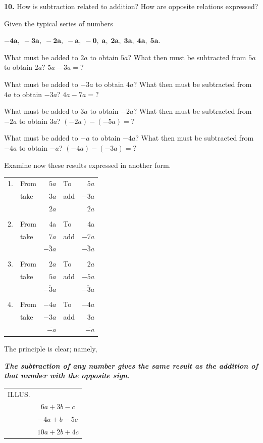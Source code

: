 \documentclass{book}
\begin{document}
\textbf{ 10.} How is subtraction related to addition? How are
opposite relations expressed?

Given the typical series of numbers

$\mathbf{- 4a,\; - 3a,\; - 2a,\; - a,\; - 0,\; a,\; 2a,\; 3a,\;
4a,\; 5a.}$

What must be added to $2a$ to obtain $5a$? What then must be
subtracted from $5a$ to obtain $2a?$ $5a - 3a = ?$

What must be added to $-3a$ to obtain $4a$? What then must be
subtracted from $4a$ to obtain $-3a$? $4a - 7a = ?$

What must be added to $3a$ to obtain $-2a$? What
then must be subtracted from $-2a$ to obtain $3a$?
$(-2a)-(-5a)=?$

What must be added to $-a$ to obtain $-4a$? What
then must be subtracted from $-4a$ to obtain $-a$?
$(-4a)-(-3a)=?$

Examine now these results expressed in another form.

\begin{tabular}{llrlr}
1.&From&$5a$&To&$5a$\\
 &take&$3a$&add&$-3a$\\
 & & $\overline{\;2a}$& &$\overline{\;2a}$\\
 \\
2.&From&4a&To&4a\\
 &take&$7a$&add&$-7a$\\
 & &$\overline{-3a}$& &$\overline{-3a}$\\
 \\
3.&From&$2a$&To&$2a$\\
 &take&$5a$&add&$-5a$\\
 & &$\overline{-3a}$& &$\overline{-3a}$\\
 \\
4.&From&$-4a$&To&$-4a$\\
 &take&$-3a$&add&$3a$\\
 & &$\overline{- a}$& &$\overline{- a}$
\end{tabular}

The principle is clear; namely,

\textbf{ \textit{The subtraction of any number gives the same
result as the addition of that number with the opposite sign.}}

\begin{tabular}{cc}
ILLUS.&  \\
&$ 6a+3b- c $ \\
&$-4a+ b-5c$\\
&$\overline{10a+2b+4c}$
\end{tabular}
\end{document}
